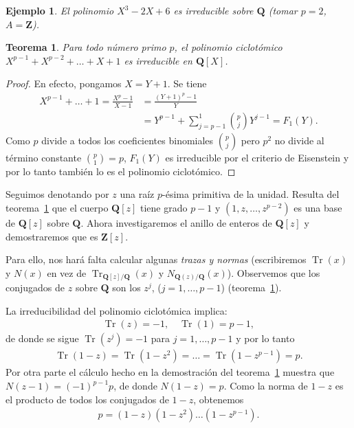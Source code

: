 \documentclass[oneside,bibtotoc,leqno,spanish]{amsbook}
\newcommand{\QQ}{\mathbf{Q}}
\newcommand{\ZZ}{\mathbf{Z}}
\newcommand{\QED}{}%
\DeclareMathOperator{\Tr}{Tr}
\numberwithin{equation}{section}
\theoremstyle{defi}
\theoremstyle{note}
\newtheorem{theorem}{Teorema}
\theoremstyle{rem}
\newtheorem*{example*}{Ejemplo}
\numberwithin{theorem}{section}
\numberwithin{proposition}{section}
\numberwithin{definition}{section}
\numberwithin{lemma}{section}
\numberwithin{corollary}{section}
\numberwithin{example}{section}
\numberwithin{footnote}{section}%
\begin{document}
\begin{example*}
El polinomio $X^{3}-2X+6$ es irreducible sobre $\QQ$ (tomar $p=2$, $A=\ZZ$).
\end{example*}

\begin{theorem}\label{teo2.9.1}
Para todo n\'umero primo $p$, el polinomio ciclot\'omico $X^{p-1}+X^{p-2}+\dots+X+1$ es irreducible
en $\QQ[X]$.
\end{theorem}

\begin{proof}
En efecto, pongamos $X = Y+1$. Se tiene
\begin{align*}
X^{p-1}+\dots+1 = \frac{X^{p}-1}{X-1} &= \frac{(Y+1)^{p}-1}{Y}\\
&=Y^{p-1}+\sum_{j=p-1}^{1}\binom{p}{j}Y^{j-1}=F_{1}(Y).
\end{align*}
Como $p$ divide a todos los coeficientes binomiales $\binom{p}{j}$ pero $p^{2}$ no divide al
t\'ermino constante $\binom{p}{1} = p$, $F_{1}(Y)$ es irreducible por el criterio de Eisenstein y
por lo tanto tambi\'en lo es el polinomio ciclot\'omico. \QED
\end{proof}

Seguimos denotando por $z$ una ra\'iz $p$-\'esima primitiva de la unidad. Resulta del
teorema~\ref{teo2.9.1} que el cuerpo
$\QQ[z]$ tiene grado $p-1$ y $(1,z,\dots,z^{p-2})$ es una base de  $\QQ[z]$ sobre $\QQ$. Ahora investigaremos el
anillo de enteros de $\QQ[z]$ y demostraremos que es $\ZZ[z]$.

Para ello, nos har\'a falta calcular algunas {\em trazas y normas} (escribiremos $\Tr(x)$ y $N(x)$ en vez
de $\Tr_{\QQ[z]/\QQ}(x)$ y $N_{\QQ(z)/\QQ}(x)$). Observemos que los conjugados de $z$ sobre $\QQ$ son los
$z^{j}$, ($j=1,\dots,p-1$) (teorema~\ref{teo2.9.1}).

La irreducibilidad del polinomio ciclot\'omica implica:
\begin{gather}\label{eq-2.9-1}
\Tr(z) = -1,\quad\Tr(1)=p-1,
\end{gather}
de donde se sigue $\Tr(z^{j}) = -1$ para $j=1,\dots,p-1$ y por lo tanto
\begin{gather}\label{eq-2.9-2}
\Tr(1-z) = \Tr(1-z^{2})=\dots=\Tr(1-z^{p-1}) = p.
\end{gather}
Por otra parte el c\'alculo hecho en la demostraci\'on del teorema~\ref{teo2.9.1} muestra que $N(z-1)=(-1)^{p-1}p$, de donde
$N(1-z)=p$. Como la norma de $1-z$ es el producto de todos los conjugados de $1-z$, obtenemos
\begin{gather}\label{eq-2.9-3}
p=(1-z)(1-z^{2})\dots(1-z^{p-1}).
\end{gather}
\end{document}
